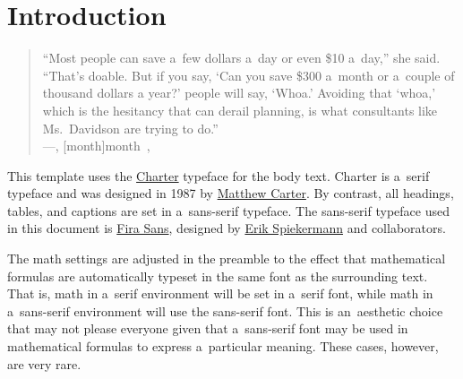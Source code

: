 


\renewcommand{\blindmarkup}[1]{\emph{#1}}
\blindmathfalse


\section{Introduction}
\label{sec:introduction}

\begin{quote}
``Most people can save a~few dollars a~day or even \$10 a~day,'' she said. ``That’s doable. But if you say, `Can you save \$300 a~month or a~couple of thousand dollars a year?' people will say, `Whoa.' Avoiding that `whoa,' which is the hesitancy that can derail planning, is what consultants like Ms.~Davidson are trying to do.'' \\
\upshape
\mbox{}\hfill---\textit{}, [month]{month}~, 
\end{quote}

%
%
%
%
%

This template uses the \href{https://en.wikipedia.org/wiki/Bitstream_Charter}{Charter} typeface for the body text. Charter is a~serif type\-face and was designed in 1987 by \href{https://en.wikipedia.org/wiki/Matthew_Carter}{Matthew Carter}. By contrast, all headings, tables, and captions are set in a~sans-serif typeface. The sans-serif typeface used in this document is \href{https://en.wikipedia.org/wiki/Fira_Sans}{Fira Sans}, designed by \href{https://en.wikipedia.org/wiki/Erik_Spiekermann}{Erik Spiekermann} and collaborators.

The math settings are adjusted in the preamble to the effect that mathematical formulas are automatically typeset in the same font as the surrounding text. That is, math in a~serif environment will be set in a~serif font, while math in a~sans-serif environment will use the sans-serif font. This is an~aesthetic choice that may not please everyone given that a~sans-serif font may be used in mathematical formulas to express a~particular meaning. These cases, however, are very rare.

